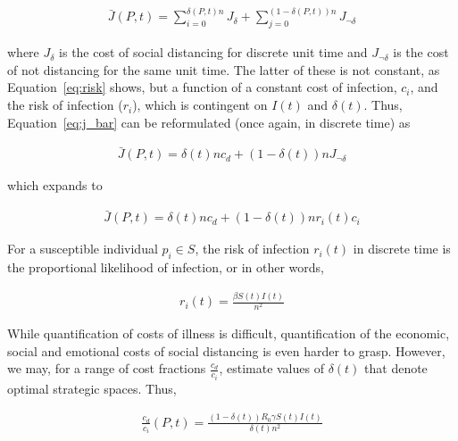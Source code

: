 \documentclass{article}
\begin{document}
\begin{equation}
	\begin{aligned}
		\bar{J}(P, t) = \sum_{i=0}^{\delta(P, t) n} J_{\delta} + \sum_{j=0}^{(1-\delta(P, t)) n} J_{\lnot \delta}
	\end{aligned}
	\label{eq:j_bar}
\end{equation}

\noindent where $J_{\delta}$ is the cost of social distancing for discrete unit time and $J_{\lnot \delta}$ is the cost of not distancing for the same unit time. The latter of these is not constant, as Equation~\eqref{eq:risk} shows, but a function of a constant cost of infection, $c_i$, and the risk of infection ($r_i$), which is contingent on $I(t)$ and $\delta(t)$. Thus, Equation~\eqref{eq:j_bar} can be reformulated (once again, in discrete time) as

\begin{equation}
	\begin{aligned}
		\bar{J}(P, t) = \delta(t) n c_d + (1 - \delta(t)) n J_{\lnot \delta}
	\end{aligned}
\end{equation}

\noindent which expands to

\begin{equation}
	\begin{aligned}
		\bar{J}(P, t) = \delta(t) n c_d + (1 - \delta(t)) n r_i(t) c_i
	\end{aligned}
\end{equation}

For a susceptible individual $p_i \in S$, the risk of infection $r_i(t)$ in discrete time is the proportional likelihood of infection, or in other words, 

\begin{equation}
	\begin{aligned}
		r_i(t) = \frac{\beta S(t) I(t)}{n^2}
	\end{aligned}
\end{equation}

While quantification of costs of illness is difficult, quantification of the economic, social and emotional costs of social distancing is even harder to grasp. However, we may, for a range of cost fractions $\frac{c_d}{c_i}$, estimate values of $\delta(t)$ that denote optimal strategic spaces. Thus, 

\begin{equation}
	\begin{aligned}
		\frac{c_d}{c_i}(P, t) = \frac{(1 - \delta(t)) R_0 \gamma S(t) I(t)}{\delta(t) n^2}
	\end{aligned}
\end{equation}
\end{document}
